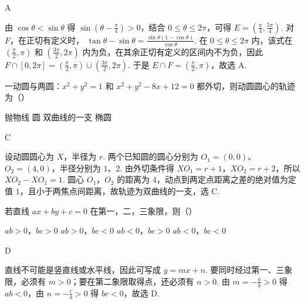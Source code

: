 \documentclass[UTF8,a4paper,oneside,11pt]{ctexbook}
\begin{document}
\begin{answer}
A
\end{answer}

\begin{solution}
由 \(\cos\theta<\sin\theta\) 得 \(\sin\left(\theta-\frac{\pi}{4}\right)>0\)，结合 \(0\leqslant\theta\leqslant2\pi\)，可得 \(E=\left(\frac{\pi}{4},\frac{5\pi}{4}\right)\). 对 \(F\)，在正切有定义时，
\(\tan\theta-\sin\theta=\frac{\sin\theta(1-\cos\theta)}{\cos\theta}\). 在 \(0\leqslant\theta\leqslant2\pi\) 内，该式在 \(\left(\frac{\pi}{2},\pi\right)\) 和 \(\left(\frac{3\pi}{2},2\pi\right)\) 内为负，在其余正切有定义的区间内不为负，因此 \(F\cap[0,2\pi]=\left(\frac{\pi}{2},\pi\right)\cup\left(\frac{3\pi}{2},2\pi\right)\). 于是 \(E\cap F=\left(\frac{\pi}{2},\pi\right)\)，故选 A.
\end{solution}

\begin{problem}
一动圆与两圆：\(x^2 + y^2 = 1\) 和 \(x^2 + y^2 - 8x + 12 = 0\) 都外切，则动圆圆心的轨迹为（\quad）

\choices
    {抛物线}
    {圆}
    {双曲线的一支}
    {椭圆}
\end{problem}

\begin{answer}
C
\end{answer}

\begin{solution}
设动圆圆心为 \(X\)，半径为 \(r\). 两个已知圆的圆心分别为 \(O_1=(0,0)\)、\(O_2=(4,0)\)，半径分别为 \(1\)、\(2\). 由外切条件得 \(XO_1=r+1\)，\(XO_2=r+2\)，所以 \(XO_2-XO_1=1\). 圆心 \(O_1\)，\(O_2\) 的距离为 \(4\)，动点到两定点距离之差的绝对值为定值 \(1\)，且小于两焦点间距离，故轨迹为双曲线的一支，选 C.
\end{solution}

\begin{problem}
若直线 \(ax + by + c = 0\) 在第一，二，三象限，则（\quad）

\choices
    {\(ab > 0\)，\(bc > 0\)}
    {\(ab > 0\)，\(bc < 0\)}
    {\(ab < 0\)，\(bc > 0\)}
    {\(ab < 0\)，\(bc < 0\)}
\end{problem}

\begin{answer}
D
\end{answer}

\begin{solution}
直线不可能是竖直线或水平线，因此可写成 \(y=mx+n\). 要同时经过第一、三象限，必须有 \(m>0\)；要在第二象限取得点，还必须有 \(n>0\). 由 \(m=-\frac{a}{b}>0\) 得 \(ab<0\)，由 \(n=-\frac{c}{b}>0\) 得 \(bc<0\)，故选 D.
\end{solution}
\end{document}
